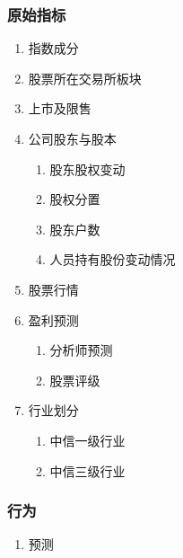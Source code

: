 \documentclass[11pt]{article}
\begin{document}
\subsubsection{原始指标}
\label{sec:orgheadline26}
\begin{enumerate}
\item 指数成分
\label{sec:orgheadline11}
\item 股票所在交易所板块
\label{sec:orgheadline12}
\item 上市及限售
\label{sec:orgheadline13}
\item 公司股东与股本
\label{sec:orgheadline18}
\begin{enumerate}
\item 股东股权变动
\label{sec:orgheadline14}
\item 股权分置
\label{sec:orgheadline15}
\item 股东户数
\label{sec:orgheadline16}
\item 人员持有股份变动情况
\label{sec:orgheadline17}
\end{enumerate}
\item 股票行情
\label{sec:orgheadline19}
\item 盈利预测
\label{sec:orgheadline22}
\begin{enumerate}
\item 分析师预测
\label{sec:orgheadline20}
\item 股票评级
\label{sec:orgheadline21}
\end{enumerate}
\item 行业划分
\label{sec:orgheadline25}
\begin{enumerate}
\item 中信一级行业
\label{sec:orgheadline23}
\item 中信三级行业
\label{sec:orgheadline24}
\end{enumerate}
\end{enumerate}
\subsubsection{行为}
\label{sec:orgheadline28}
\begin{enumerate}
\item 预测
\label{sec:orgheadline27}
\end{enumerate}
\end{document}
